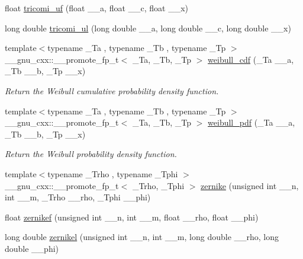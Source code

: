 \begin{DoxyCompactItemize}
\item 
float \hyperlink{group__gnu__math__spec__func_gab6eb5ec587642bf0952d6c3df1c64904}{tricomi\+\_\+uf} (float \+\_\+\+\_\+a, float \+\_\+\+\_\+c, float \+\_\+\+\_\+x)
\item 
long double \hyperlink{group__gnu__math__spec__func_gac5213af3913aeb8beb7206688889c60c}{tricomi\+\_\+ul} (long double \+\_\+\+\_\+a, long double \+\_\+\+\_\+c, long double \+\_\+\+\_\+x)
\item 
{\footnotesize template$<$typename \+\_\+\+Ta , typename \+\_\+\+Tb , typename \+\_\+\+Tp $>$ }\\\+\_\+\+\_\+gnu\+\_\+cxx\+::\+\_\+\+\_\+promote\+\_\+fp\+\_\+t$<$ \+\_\+\+Ta, \+\_\+\+Tb, \+\_\+\+Tp $>$ \hyperlink{group__gnu__math__spec__func_ga99bd93638c9e36761728231839c2948c}{weibull\+\_\+cdf} (\+\_\+\+Ta \+\_\+\+\_\+a, \+\_\+\+Tb \+\_\+\+\_\+b, \+\_\+\+Tp \+\_\+\+\_\+x)
\begin{DoxyCompactList}\small\item\em Return the Weibull cumulative probability density function. \end{DoxyCompactList}\item 
{\footnotesize template$<$typename \+\_\+\+Ta , typename \+\_\+\+Tb , typename \+\_\+\+Tp $>$ }\\\+\_\+\+\_\+gnu\+\_\+cxx\+::\+\_\+\+\_\+promote\+\_\+fp\+\_\+t$<$ \+\_\+\+Ta, \+\_\+\+Tb, \+\_\+\+Tp $>$ \hyperlink{group__gnu__math__spec__func_gae9bdc4937c57d15bc0eb3fe505f86eb2}{weibull\+\_\+pdf} (\+\_\+\+Ta \+\_\+\+\_\+a, \+\_\+\+Tb \+\_\+\+\_\+b, \+\_\+\+Tp \+\_\+\+\_\+x)
\begin{DoxyCompactList}\small\item\em Return the Weibull probability density function. \end{DoxyCompactList}\item 
{\footnotesize template$<$typename \+\_\+\+Trho , typename \+\_\+\+Tphi $>$ }\\\+\_\+\+\_\+gnu\+\_\+cxx\+::\+\_\+\+\_\+promote\+\_\+fp\+\_\+t$<$ \+\_\+\+Trho, \+\_\+\+Tphi $>$ \hyperlink{group__gnu__math__spec__func_ga5df3bb50b78cd1bc676763dbf9e64929}{zernike} (unsigned int \+\_\+\+\_\+n, int \+\_\+\+\_\+m, \+\_\+\+Trho \+\_\+\+\_\+rho, \+\_\+\+Tphi \+\_\+\+\_\+phi)
\item 
float \hyperlink{group__gnu__math__spec__func_gababce1066ecef7258070b9b7fcea975f}{zernikef} (unsigned int \+\_\+\+\_\+n, int \+\_\+\+\_\+m, float \+\_\+\+\_\+rho, float \+\_\+\+\_\+phi)
\item 
long double \hyperlink{group__gnu__math__spec__func_ga9236dd8545b448da9cb05dd8b7cf6811}{zernikel} (unsigned int \+\_\+\+\_\+n, int \+\_\+\+\_\+m, long double \+\_\+\+\_\+rho, long double \+\_\+\+\_\+phi)
\end{DoxyCompactItemize}


